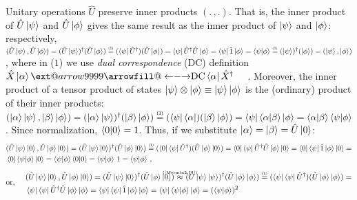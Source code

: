 \documentclass[11pt]{article}
\makeatletter
\numberwithin{equation}{section} %
\numberwithin{figure}{section} %
\newcommand\numeq[1] %
  {\stackrel{\scriptscriptstyle(\mkern-1.5mu#1\mkern-1.5mu)}{=}}
\newcommand\xleftrightarrow[2][]{%
  \ext@arrow 9999{\longleftrightarrowfill@}{#1}{#2}}
\newcommand\longleftrightarrowfill@{%
  \arrowfill@\leftarrow\relbar\rightarrow}
\makeatother
\begin{document}
\begin{appendices}
Unitary operations $\hat{U}$ preserve inner products $(.\,,.)$. That is, the inner product of $\hat{U}\ket{\psi}$ and $\hat{U}\ket{\phi}$ gives the same result as the inner product of $\ket{\psi}$ and $\ket{\phi}$: respectively, $(\hat{U}\ket{\psi},\hat{U}\ket{\phi})=(\hat{U}\ket{\psi})^\dagger(\hat{U}\ket{\phi})\numeq{1}(\bra{\psi}\hat{U}^\dagger)(\hat{U}\ket{\phi})=\bra{\psi}\hat{U}^\dagger\hat{U}\ket{\phi}=\bra{\psi}\hat{1}\ket{\phi}=\braket{\psi|\phi}\numeq{1}(\ket{\psi})^\dagger(\ket{\phi})=(\ket{\psi},\ket{\phi})$, where in ($1$) we use \emph{dual correspondence} (DC) definition $\hat{X}\ket{\alpha}\xleftrightarrow{\text{DC}}\bra{\alpha}\hat{X}^\dagger$  $\,\,\,\,$   \cite[p.~15, Eq.~(1.2.24)]{Sakurai}. Moreover, the inner product of a tensor product of states $\ket{\psi}\otimes\ket{\phi}\equiv\ket{\psi}\ket{\phi}$ is the (ordinary) product of their inner products: $(\ket{\alpha}\ket{\psi},\ket{\beta}\ket{\phi})=(\ket{\alpha}\ket{\psi})^\dagger(\ket{\beta}\ket{\phi})\numeq{1}(\bra{\psi}\bra{\alpha})(\ket{\beta}\ket{\phi})=\bra{\psi}\braket{\alpha|\beta}\ket{\phi}=\braket{\alpha|\beta}\braket{\psi|\phi}$. Since normalization, $\braket{0|0}=1$. Thus, if we substitute $\ket{\alpha}=\ket{\beta}=\hat{U}\ket{0}$:
\begin{equation} \label{Mermin2.12a}
\begin{split}
&(\hat{U}\ket{\psi}\ket{0},\hat{U}\ket{\phi}\ket{0})=
(\hat{U}\ket{\psi}\ket{0})^\dagger(\hat{U}\ket{\phi}\ket{0})\numeq{1}(\bra{0}\bra{\psi}\hat{U}^\dagger)(\hat{U}\ket{\phi}\ket{0})=\bra{0}\bra{\psi}\hat{U}^\dagger\hat{U}\ket{\phi}\ket{0}=\bra{0}\bra{\psi}\hat{1}\ket{\phi}\ket{0}=\\
&\bra{0}\braket{\psi|\phi}\ket{0}=\braket{\psi|\phi}\braket{0|0}=\braket{\psi|\phi}\,1=\braket{\psi|\phi}
\,\textrm{,}\end{split}
\end{equation}
\begin{equation} \label{Mermin2.12b}
\textrm{or, }\quad
\begin{split}
&(\hat{U}\ket{\psi}\ket{0},\hat{U}\ket{\phi}\ket{0})=(\hat{U}\ket{\psi}\ket{0})^\dagger(\hat{U}\ket{\phi}\ket{0})\,\,\newcommand\myeq1{\mathrel{\stackrel{\makebox[0pt]{\mbox{\normalfont\tiny \textrm{(\ref{Mermin2.11})}}}}{\approx}}}\,\,(\hat{U}\ket{\psi}\ket{\psi})^\dagger(\hat{U}\ket{\phi}\ket{\phi})\numeq{1}(\bra{\psi}\bra{\psi}\hat{U}^\dagger)(\hat{U}\ket{\phi}\ket{\phi})=\\
&\bra{\psi}\bra{\psi}\hat{U}^\dagger\hat{U}\ket{\phi}\ket{\phi}=\bra{\psi}\bra{\psi}\hat{1}\ket{\phi}\ket{\phi}=\bra{\psi}\braket{\psi|\phi}\ket{\phi}=(\braket{\psi|\phi})^2
\end{split}
\end{equation}


\end{appendices}
\end{document}
